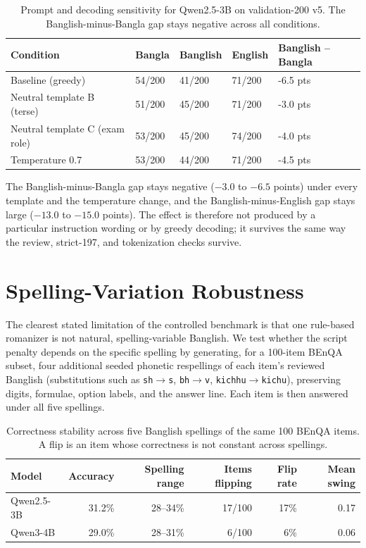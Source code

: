 \begin{table}[H]
\centering
\caption{Prompt and decoding sensitivity for Qwen2.5-3B on validation-200 v5. The Banglish-minus-Bangla gap stays negative across all conditions.}
\label{tab:prompt-sensitivity}
\small
\begin{tabular}{lllll}
\hline
Condition & Bangla & Banglish & English & Banglish -- Bangla \\
\hline
Baseline (greedy) & 54/200 & 41/200 & 71/200 & -6.5 pts \\
Neutral template B (terse) & 51/200 & 45/200 & 71/200 & -3.0 pts \\
Neutral template C (exam role) & 53/200 & 45/200 & 74/200 & -4.0 pts \\
Temperature 0.7 & 53/200 & 44/200 & 71/200 & -4.5 pts \\
\hline
\end{tabular}%
\end{table}

The Banglish-minus-Bangla gap stays negative ($-3.0$ to $-6.5$ points) under every template and the temperature change, and the Banglish-minus-English gap stays large ($-13.0$ to $-15.0$ points). The effect is therefore not produced by a particular instruction wording or by greedy decoding; it survives the same way the review, strict-197, and tokenization checks survive.

\section{Spelling-Variation Robustness}

The clearest stated limitation of the controlled benchmark is that one rule-based romanizer is not natural, spelling-variable Banglish. We test whether the script penalty depends on the specific spelling by generating, for a 100-item BEnQA subset, four additional seeded phonetic respellings of each item's reviewed Banglish (substitutions such as \texttt{sh}$\rightarrow$\texttt{s}, \texttt{bh}$\rightarrow$\texttt{v}, \texttt{kichhu}$\rightarrow$\texttt{kichu}), preserving digits, formulae, option labels, and the answer line. Each item is then answered under all five spellings.

\begin{table}[H]
\centering
\caption{Correctness stability across five Banglish spellings of the same 100 BEnQA items. A flip is an item whose correctness is not constant across spellings.}
\label{tab:spelling}
\small
\begin{tabular}{lrrrrr}
\hline
Model & Accuracy & Spelling range & Items flipping & Flip rate & Mean swing \\
\hline
Qwen2.5-3B & 31.2\% & 28--34\% & 17/100 & 17\% & 0.17 \\
Qwen3-4B & 29.0\% & 28--31\% & 6/100 & 6\% & 0.06 \\
\hline
\end{tabular}%
\end{table}

